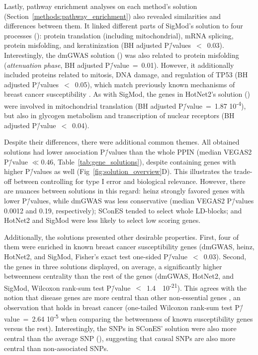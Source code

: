 \documentclass[10pt,letterpaper]{article}
\begin{document}
Lastly, pathway enrichment analyses on each method's solution (Section~\ref{methods:pathway_enrichment}) also revealed similarities and differences between them. It linked different parts of SigMod's solution to four processes (): protein translation (including mitochondrial), mRNA splicing, protein misfolding, and keratinization (BH adjusted P\=/values~$<$~0.03). Interestingly, the dmGWAS solution () was also related to protein misfolding (\emph{attenuation phase}, BH adjusted P\=/value~=~0.01). However, it additionally included proteins related to mitosis, DNA damage, and regulation of TP53 (BH adjusted P\=/values~$<$~0.05), which match previously known mechanisms of breast cancer susceptibility \cite{nielsen_hereditary_2016}. As with SigMod, the genes in HotNet2's solution () were involved in mitochondrial translation (BH adjusted P\=/value~=~1.87 \texttimes{} 10\textsuperscript{-4}), but also in glycogen metabolism and transcription of nuclear receptors (BH adjusted P\=/value~$<$~0.04).

Despite their differences, there were additional common themes. All obtained solutions had lower association P\=/values than the whole PPIN (median VEGAS2 P\=/value $\ll 0.46$, Table~\ref{tab:gene_solutions}), despite containing genes with higher P\=/values as well (Fig~\ref{fig:solution_overview}D). This illustrates the trade-off between controlling for type I error and biological relevance. However, there are nuances between solutions in this regard: heinz strongly favored genes with lower P\=/values, while dmGWAS was less conservative (median VEGAS2 P\=/values 0.0012 and 0.19, respectively); SConES tended to select whole LD-blocks; and HotNet2 and SigMod were less likely to select low scoring genes.

Additionally, the solutions presented other desirable properties. First, four of them were enriched in known breast cancer susceptibility genes (dmGWAS, heinz, HotNet2, and SigMod, Fisher's exact test one-sided P\=/value~$<$~0.03). Second, the genes in three solutions displayed, on average, a significantly higher betweenness centrality than the rest of the genes (dmGWAS, HotNet2, and SigMod, Wilcoxon rank-sum test P\=/value~$<$~1.4~\texttimes{}~10\textsuperscript{-21}). This agrees with the notion that disease genes are more central than other non-essential genes \cite{pinero_uncovering_2016}, an observation that holds in breast cancer (one-tailed Wilcoxon rank-sum test P\=/value~=~2.64 \texttimes{} 10\textsuperscript{-5} when comparing the betweenness of known susceptibility genes versus the rest). Interestingly, the SNPs in SConES' solution were also more central than the average SNP (), suggesting that causal SNPs are also more central than non-associated SNPs.
\end{document}

